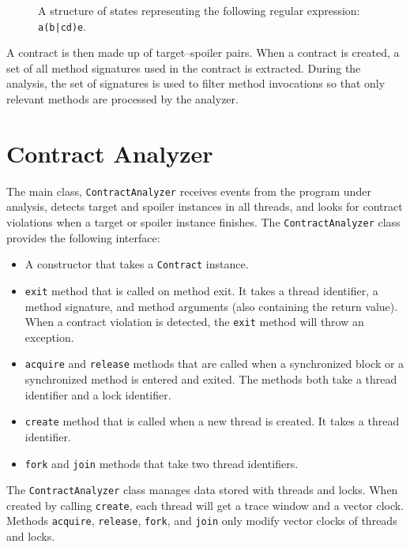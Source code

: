 \begin{figure}[hbt]
    \begin{center}
        \label{states}
        
        \caption{A structure of states representing the following regular
        expression: \texttt{a(b|cd)e}.}
    \end{center}
\end{figure}

A contract is then made up of target--spoiler pairs. When a contract is created,
a set of all method signatures used in the contract is extracted. During the
analysis, the set of signatures is used to filter method invocations so that
only relevant methods are processed by the analyzer.

\section{Contract Analyzer}
\label{contractAnalyzer}
The main class, \texttt{ContractAnalyzer} receives events from the program under
analysis, detects target and spoiler instances in all threads, and looks for
contract violations when a target or spoiler instance finishes. The
\texttt{ContractAnalyzer} class provides the following interface:
\begin{itemize}
    \item A constructor that takes a \texttt{Contract} instance.
    \item \texttt{exit} method that is called on method exit. It takes a thread
        identifier, a method signature, and method arguments (also containing
        the return value). When a contract violation is detected, the
        \texttt{exit} method will throw an exception.
    \item \texttt{acquire} and \texttt{release} methods that are called when a
        synchronized block or a synchronized method is entered and exited. The
        methods both take a thread identifier and a lock identifier.
    \item \texttt{create} method that is called when a new thread is created. It
        takes a thread identifier.
    \item \texttt{fork} and \texttt{join} methods that take two thread
        identifiers.
\end{itemize}

The \texttt{ContractAnalyzer} class manages data stored with threads and locks.
When created by calling \texttt{create}, each thread will get a trace window and
a vector clock. Methods \texttt{acquire}, \texttt{release}, \texttt{fork}, and
\texttt{join} only modify vector clocks of threads and locks.

